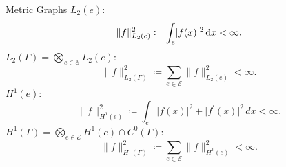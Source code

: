\documentclass[9pt]{beamer}
\begin{document}
\begin{frame}{Metric Graphs}
    $L_2(e)$:
    \begin{equation*}
        \lVert f \rVert^{2}_{L_2(e)} \coloneqq \int_e \lvert f(x) \rvert^2 \, \textup{d} x < \infty.
    \end{equation*}
    $L_2(\Gamma) = \bigotimes_{e \in \mathcal{E}} L_2(e)$:
    \begin{equation*}
        \lVert f \rVert^{2}_{L_2(\Gamma)} \coloneqq \sum_{e \in \mathcal{E}} \lVert f \rVert^{2}_{L_2(e)} < \infty.
    \end{equation*}
    $H^1 (e)$:
    \begin{equation*}
        \lVert f \rVert^{2}_{H^1(e)} \coloneqq \int_e \lvert f(x) \rvert^2 + \lvert f^{\prime}(x) \rvert^2 \, dx < \infty.
    \end{equation*}
    $H^1 (\Gamma) =  \bigotimes_{e \in \mathcal{E}} H^1 (e) \cap C^{0}(\Gamma)$:
    \begin{equation*}
        \lVert f \rVert^{2}_{H^1 (\Gamma)} \coloneqq \sum_{e \in \mathcal{E}} \lVert f \rVert^{2}_{H^1 (e)} < \infty.
    \end{equation*}
\end{frame}
\end{document}
